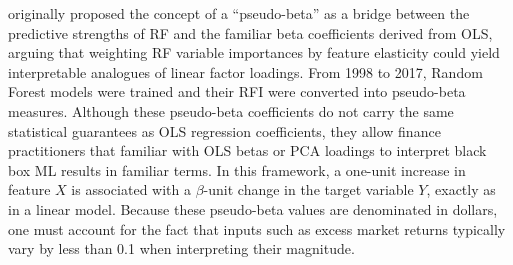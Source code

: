  originally proposed the concept of a “pseudo-beta” as a bridge between the predictive strengths of RF and the familiar beta coefficients derived from OLS, arguing that weighting RF variable importances by feature elasticity could yield interpretable analogues of linear factor loadings. From 1998 to 2017, Random Forest models were trained and their RFI were converted into pseudo-beta measures. Although these pseudo-beta coefficients do not carry the same statistical guarantees as OLS regression coefficients, they allow finance practitioners that familiar with OLS betas or PCA loadings to interpret black box ML results in familiar terms. In this framework, a one-unit increase in feature $X$ is associated with a $\beta$-unit change in the target variable $Y$, exactly as in a linear model. Because these pseudo-beta values are denominated in dollars, one must account for the fact that inputs such as excess market returns typically vary by less than 0.1 when interpreting their magnitude.

\begin{landscape}




\end{landscape}



